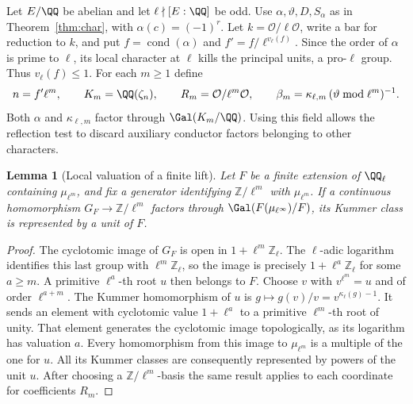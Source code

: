 \documentclass[a4paper,11pt]{article}
\newtheorem{lemma}[proposition]{Lemma}
\theoremstyle{definition}
\theoremstyle{remark}
\newcommand{\ZZ}{\mathbb Z}\newcommand{\ord}{\operatorname{ord}}
\numberwithin{equation}{section}
\newcommand{\OO}{\mathcal O}
\begin{document}
Let \(E/\QQ\) be abelian and let \(\ell\nmid[E:\QQ]\) be odd. Use \(\alpha,\vartheta,D,S_\alpha\) as in Theorem~\ref{thm:char}, with \(\alpha(c)=(-1)^r\). Let \(k=\OO/\ell\OO\), write a bar for reduction to \(k\), and put \(f=\operatorname{cond}(\alpha)\) and \(f'=f/\ell^{v_\ell(f)}\). Since the order of \(\alpha\) is prime to \(\ell\), its local character at \(\ell\) kills the principal units, a pro-\(\ell\) group. Thus \(v_\ell(f)\le1\). For each \(m\ge1\) define
\[
 n=f'\ell^m,\qquad K_m=\QQ(\zeta_n),\qquad
 R_m=\OO/\ell^m\OO,\qquad \beta_m=\kappa_{\ell,m}\,(\vartheta\bmod\ell^m)^{-1}.
\]
Both \(\alpha\) and \(\kappa_{\ell,m}\) factor through \(\Gal(K_m/\QQ)\). Using this field allows the reflection test to discard auxiliary conductor factors belonging to other characters.

\begin{lemma}[Local valuation of a finite lift]\label{lem:localunit24}
Let \(F\) be a finite extension of \(\QQ_\ell\) containing \(\mu_{\ell^m}\), and fix a generator identifying \(\ZZ/\ell^m\) with \(\mu_{\ell^m}\). If a continuous homomorphism \(G_F\to\ZZ/\ell^m\) factors through \(\Gal(F(\mu_{\ell^\infty})/F)\), its Kummer class is represented by a unit of \(F\).
\end{lemma}
\begin{proof}
The cyclotomic image of \(G_F\) is open in \(1+\ell^m\ZZ_\ell\). The \(\ell\)-adic logarithm identifies this last group with \(\ell^m\ZZ_\ell\), so the image is precisely \(1+\ell^a\ZZ_\ell\) for some \(a\ge m\). A primitive \(\ell^a\)-th root \(u\) then belongs to \(F\). Choose \(v\) with \(v^{\ell^m}=u\) and of order \(\ell^{a+m}\). The Kummer homomorphism of \(u\) is \(g\mapsto g(v)/v=v^{\kappa_\ell(g)-1}\). It sends an element with cyclotomic value \(1+\ell^a\) to a primitive \(\ell^m\)-th root of unity. That element generates the cyclotomic image topologically, as its logarithm has valuation \(a\). Every homomorphism from this image to \(\mu_{\ell^m}\) is a multiple of the one for \(u\). All its Kummer classes are consequently represented by powers of the unit \(u\). After choosing a \(\ZZ/\ell^m\)-basis the same result applies to each coordinate for coefficients \(R_m\).
\end{proof}
\end{document}
